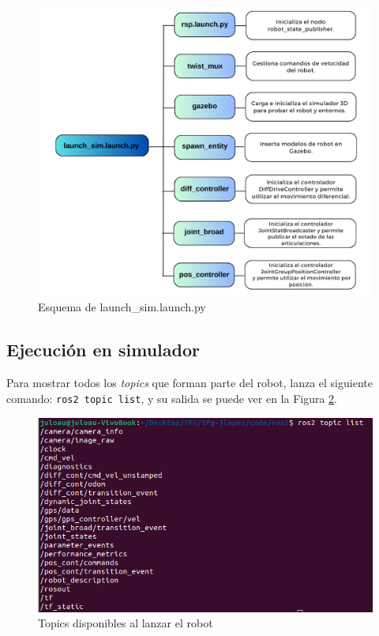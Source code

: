 \begin{figure} [h!]
	\begin{center}
		\includegraphics[width=14cm]{figs/cap6/diagram.png}
	\end{center}
	\caption{Esquema de launch\_sim.launch.py}
	\label{fig:launcherdiagram}
\end{figure}


\subsection{Ejecución en simulador}
\label{subsec:funsimulacion}

Para mostrar todos los \textit{topics} que forman parte del robot, lanza el siguiente comando:  \verb|ros2 topic list|, y su salida se puede ver en la Figura \ref{fig:topic}.

 \begin{figure} [h!]
	\begin{center}
		\includegraphics[width=12cm]{figs/cap6/topic.png}
	\end{center}
	\caption{Topics disponibles al lanzar el robot}
	\label{fig:topic}
\end{figure}


